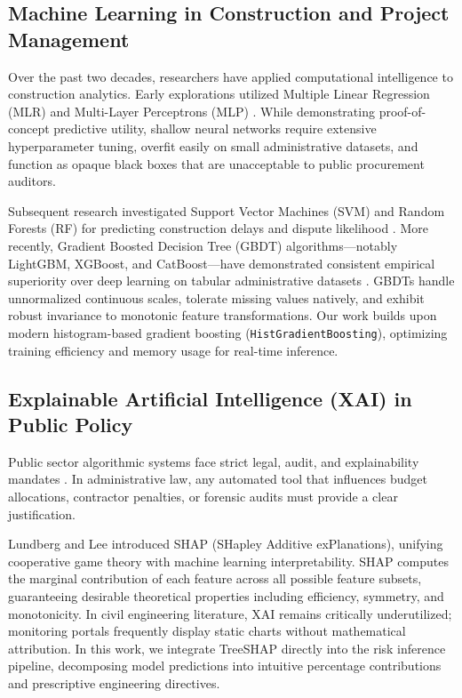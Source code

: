 \documentclass[conference]{IEEEtran}
\begin{document}
\subsection{Machine Learning in Construction and Project Management}
Over the past two decades, researchers have applied computational intelligence to construction analytics. Early explorations utilized Multiple Linear Regression (MLR) and Multi-Layer Perceptrons (MLP) \cite{b6,b7}. While demonstrating proof-of-concept predictive utility, shallow neural networks require extensive hyperparameter tuning, overfit easily on small administrative datasets, and function as opaque black boxes that are unacceptable to public procurement auditors.

Subsequent research investigated Support Vector Machines (SVM) and Random Forests (RF) for predicting construction delays and dispute likelihood \cite{b8}. More recently, Gradient Boosted Decision Tree (GBDT) algorithms---notably LightGBM, XGBoost, and CatBoost---have demonstrated consistent empirical superiority over deep learning on tabular administrative datasets \cite{b9,b10}. GBDTs handle unnormalized continuous scales, tolerate missing values natively, and exhibit robust invariance to monotonic feature transformations. Our work builds upon modern histogram-based gradient boosting (\texttt{HistGradientBoosting}), optimizing training efficiency and memory usage for real-time inference.

\subsection{Explainable Artificial Intelligence (XAI) in Public Policy}
Public sector algorithmic systems face strict legal, audit, and explainability mandates \cite{b11}. In administrative law, any automated tool that influences budget allocations, contractor penalties, or forensic audits must provide a clear justification. 

Lundberg and Lee \cite{b12} introduced SHAP (SHapley Additive exPlanations), unifying cooperative game theory with machine learning interpretability. SHAP computes the marginal contribution of each feature across all possible feature subsets, guaranteeing desirable theoretical properties including efficiency, symmetry, and monotonicity. In civil engineering literature, XAI remains critically underutilized; monitoring portals frequently display static charts without mathematical attribution. In this work, we integrate TreeSHAP directly into the risk inference pipeline, decomposing model predictions into intuitive percentage contributions and prescriptive engineering directives.
\end{document}
